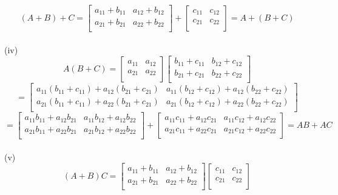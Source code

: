 \documentclass{article}
\begin{document}
\[
(A+B)+C=
\begin{bmatrix}
a_{11}+b_{11} & a_{12}+b_{12}\\
a_{21}+b_{21} & a_{22}+b_{22}\\
\end{bmatrix}
+
\begin{bmatrix}
c_{11} & c_{12}\\
c_{21} & c_{22}\\
\end{bmatrix}
=A+(B+C)
\]\\
(iv)
\[
A(B+C)=
\begin{bmatrix}
a_{11} & a_{12}\\
a_{21} & a_{22}\\
\end{bmatrix}
\begin{bmatrix}
b_{11}+c_{11} & b_{12}+c_{12}\\
b_{21}+c_{21} & b_{22}+c_{22}\\
\end{bmatrix}
\]
\[
=
\begin{bmatrix}
a_{11}(b_{11} + c_{11}) + a_{12}(b_{21} + c_{21}) & a_{11}(b_{12} + c_{12}) + a_{12}(b_{22} + c_{22}) \\
a_{21}(b_{11} + c_{11}) + a_{22}(b_{21} + c_{21}) & a_{21}(b_{12} + c_{12}) + a_{22}(b_{22} + c_{22}) \\
\end{bmatrix}
\]
\[
=
\begin{bmatrix}
a_{11}b_{11} + a_{12}b_{21} & a_{11}b_{12} + a_{12}b_{22} \\
a_{21}b_{11}+ a_{22}b_{21}& a_{21}b_{12} + a_{22}b_{22} \\
\end{bmatrix}
+
\begin{bmatrix}
a_{11}c_{11} + a_{12}c_{21} & a_{11}c_{12} + a_{12}c_{22} \\
a_{21}c_{11}+ a_{22}c_{21}& a_{21}c_{12} + a_{22}c_{22} \\
\end{bmatrix}
=AB+AC
\]
\\(v)
\[
(A+B)C =
\begin{bmatrix}
a_{11} + b_{11} & a_{12} + b_{12} \\
a_{21} + b_{21} & a_{22} + b_{22} \\
\end{bmatrix}
\begin{bmatrix}
c_{11} & c_{12} \\
c_{21} & c_{22} \\
\end{bmatrix}
\]
\end{document}
